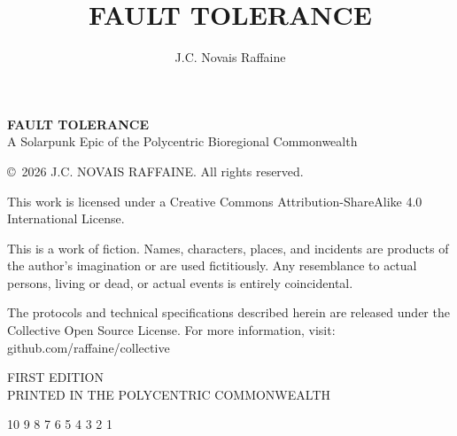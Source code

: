 \documentclass[11pt, openany]{book}
\title{\headerfont\Huge\textbf{FAULT TOLERANCE}}
\author{\headerfont J.C. Novais Raffaine}
\date{}
\newcommand{\headerfont}{\sffamily} %
\begin{document}


\newpage
\thispagestyle{empty}
\vspace*{\fill}

\begin{flushleft}
    {\headerfont\large\textbf{FAULT TOLERANCE}} \\
    {\headerfont\small A Solarpunk Epic of the Polycentric Bioregional Commonwealth} \\
    \vspace{2ex}
    
    {\small \copyright\ 2026 J.C. NOVAIS RAFFAINE. All rights reserved.} \\
    \vspace{2ex}
    
    {\small This work is licensed under a Creative Commons Attribution-ShareAlike 4.0 International License.} \\
    \vspace{2ex}

    {\footnotesize 
    This is a work of fiction. Names, characters, places, and incidents are products of the author's imagination or are used fictitiously. Any resemblance to actual persons, living or dead, or actual events is entirely coincidental. \\
    \vspace{1ex}
    
    The protocols and technical specifications described herein are released under the Collective Open Source License. For more information, visit: \\
    \headerfont\color{collectiveBlue} github.com/raffaine/collective
    }
    
    \vspace{4ex}
    
    {\headerfont\scriptsize FIRST EDITION} \\
    {\headerfont\scriptsize PRINTED IN THE POLYCENTRIC COMMONWEALTH} \\
    \vspace{2ex}
    
    {\headerfont\tiny 10 9 8 7 6 5 4 3 2 1}
\end{flushleft}
\vspace{2ex}

\frontmatter
\maketitle
\tableofcontents
\end{document}
